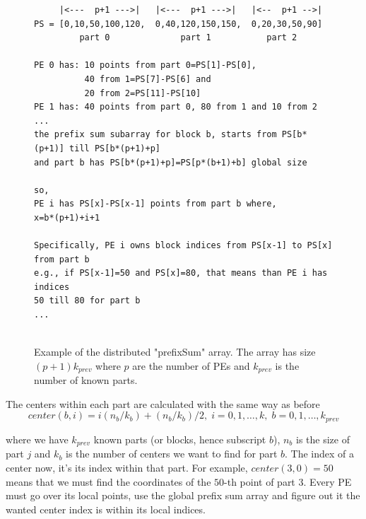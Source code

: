 \documentclass[a4paper,10pt]{article}
\begin{document}
\begin{figure}[b]
\begin{verbatim}
     |<---  p+1 --->|   |<---  p+1 --->|   |<--  p+1 -->|
PS = [0,10,50,100,120,  0,40,120,150,150,  0,20,30,50,90]
         part 0              part 1           part 2  
    
PE 0 has: 10 points from part 0=PS[1]-PS[0], 
          40 from 1=PS[7]-PS[6] and 
          20 from 2=PS[11]-PS[10]
PE 1 has: 40 points from part 0, 80 from 1 and 10 from 2
...
the prefix sum subarray for block b, starts from PS[b*(p+1)] till PS[b*(p+1)+p]
and part b has PS[b*(p+1)+p]=PS[p*(b+1)+b] global size

so,
PE i has PS[x]-PS[x-1] points from part b where,
x=b*(p+1)+i+1

Specifically, PE i owns block indices from PS[x-1] to PS[x] from part b
e.g., if PS[x-1]=50 and PS[x]=80, that means than PE i has indices 
50 till 80 for part b
...


\end{verbatim}
\caption{Example of the distributed "prefixSum" array. The array has size $(p+1)k_{prev}$ 
where $p$ are the number of PEs and $k_{prev}$ is the number of known parts.}
\label{fig:prefixSum}
\end{figure}

The centers within each part are calculated with the same way as before
\begin{equation}
center(b,i) = i(n_b/k_b)+(n_b/k_b)/2,\; i=0,1,\dots, k, \; b=0,1,\dots,k_{prev}
\label{eq:centers}
\end{equation}

where we have $k_{prev}$ known parts (or blocks, hence subscript $b$), $n_b$ is the size of part $j$ 
and $k_b$ is the number of centers we want to find for part $b$.
The index of a center now, it's its index within that part. For example, $center(3,0)=50$ means
that we must find the coordinates of the $50$-th point of part 3.
Every PE must go over its local points, use the global prefix sum array and figure out it the wanted
center index is within its local indices.
\end{document}
